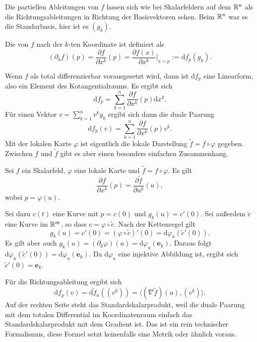 Die partiellen Ableitungen von $f$ lassen sich wie bei Skalarfeldern
auf dem $\mathbb R^n$ als die Richtungsableitungen in Richtung der
Basisvektoren sehen. Beim $\mathbb R^n$ war es die Standarbasis, hier ist
es $(g_k)$.
\begin{definition}
Die  von $f$ nach der $k$-ten Koordinate
ist definiert als
\begin{equation}
(\partial_k f)(p) = \frac{\partial f}{\partial x^k}(p)
= \frac{\partial f(x)}{\partial x^k}\Big|_{x=p} :=
\mathrm df_p(g_k).
\end{equation}
\end{definition}
Wenn $f$ als total differenzierbar vorausgesetzt wird, dann ist
$\mathrm df_p$ eine Linearform, also ein Element des
Kotangentialraums. Es ergibt sich
\begin{equation}
\mathrm df_p = \sum_{k=1}^n \frac{\partial f}{\partial x^k}(p)\mathrm dx^k.
\end{equation}
Für einen Vektor $v=\sum_{k=1}^n v^k g_k$ ergibt
sich dann die duale Paarung
\begin{equation}
\mathrm df_p(v) = \sum_{k=1}^n \frac{\partial f}{\partial x^k}(p)v^k.
\end{equation}
Mit der lokalen Karte $\varphi$ ist eigentlich die lokale
Darstellung $\tilde f=f\circ\varphi$ gegeben. Zwischen
$f$ und $\tilde f$ gibt es aber einen besonders einfachen Zusammenhang.
\begin{corollary}
Sei $f$ ein Skalarfeld, $\varphi$ eine lokale Karte und
$\tilde f=f\circ\varphi$. Es gilt%
\begin{equation}
\frac{\partial f}{\partial x^k}(p) = \frac{\partial\tilde f}{\partial u^k}(u),
\end{equation}
wobei $p=\varphi(u)$.
\end{corollary}
 Sei dazu $c(t)$ eine Kurve mit $p=c(0)$ und
$g_k(u)=c'(0)$. Sei außerdem $\tilde c$ eine Kurve im $\mathbb R^m$, so dass
$c=\varphi\circ \tilde c$. Nach der Kettenregel gilt
\begin{equation}
g_k(u) = c'(0) = (\varphi\circ\tilde c)'(0) = \mathrm d\varphi_u(\tilde c'(0)).
\end{equation}
Es gilt aber auch $g_k(u) = (\partial_k\varphi)(u) =
\mathrm d\varphi_u(\mathbf e_k)$. Daraus folgt
$\mathrm d\varphi_u(\tilde c'(0)) = \mathrm d\varphi_u(\mathbf e_k)$.
Da $\mathrm d\varphi_u$ eine injektive Abbildung ist, ergibt sich
$\tilde c'(0) = \mathbf e_k$.\;\qedsymbol

Für die Richtungsableitung ergibt sich
\begin{equation}
\mathrm df_p(v) = \mathrm d\tilde f_u((v^k)) =
\langle(\nabla \tilde f)(u),(v^k)\rangle.
\end{equation}
Auf der rechten Seite steht das Standardskalarprodukt, weil die
duale Paarung mit dem totalen Differential im Koordinatenraum einfach
das Standardskalarprodukt mit dem Gradient ist. Das ist ein rein
technischer Formalismus, diese Formel setzt keinenfalls eine
Metrik oder ähnlich voraus.


